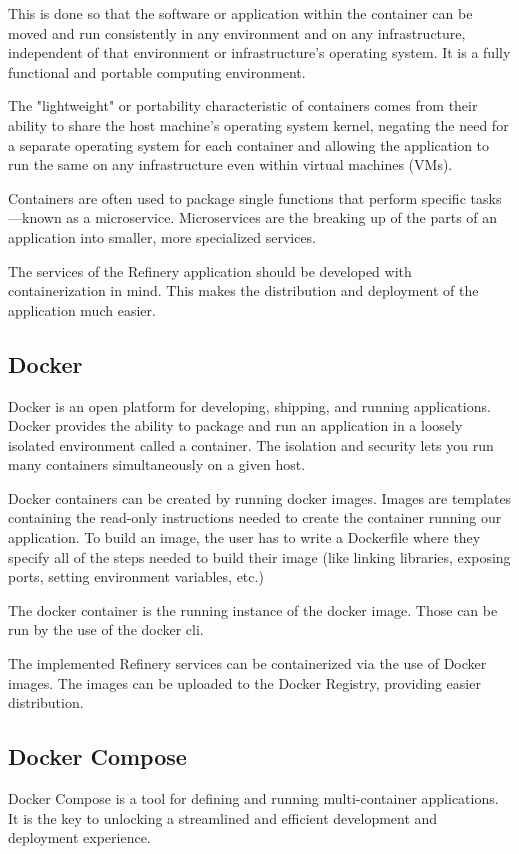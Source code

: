 	This is done so that the software or application within the container can be moved and run consistently 
	in any environment and on any infrastructure, independent of that environment or infrastructure’s 
	operating system. It is a fully functional 
	and portable computing environment.

	The "lightweight" or portability characteristic of containers comes from their ability to share 
	the host machine’s operating system kernel, negating the need for a separate operating system for 
	each container and allowing the application to run the same on any infrastructure 
	even within virtual machines (VMs).

	Containers are often used to package single functions that perform specific tasks—known as a microservice. 
	Microservices are the breaking up of the parts of an application into smaller, more specialized services. 

	The services of the Refinery application should be developed with containerization in mind. This makes 
	the distribution and deployment of the application much easier.

	\subsection{Docker}
		Docker \cite{docker} is an open platform for developing, shipping, and running applications. 
		Docker provides the ability to package and run an application in a loosely isolated environment 
		called a container. The isolation and security lets you run many containers simultaneously 
		on a given host.

		Docker containers can be created by running docker images. Images are templates 
		containing the read-only instructions needed 
		to create the container running our application. To build an image, the user has to write a Dockerfile
		where they specify all of the steps needed to build their image (like linking libraries, exposing ports, 
		setting environment variables, etc.)

		The docker container is the running instance of the docker image. Those can be run by the use of the docker cli.

		The implemented Refinery services can be containerized via the use of Docker images. The images can be uploaded to the 
		Docker Registry, providing easier distribution.


	\subsection{Docker Compose}
		Docker Compose \cite{dockercompose} is a tool for defining and running multi-container applications. 
		It is the key to unlocking a streamlined and efficient development and deployment experience.

